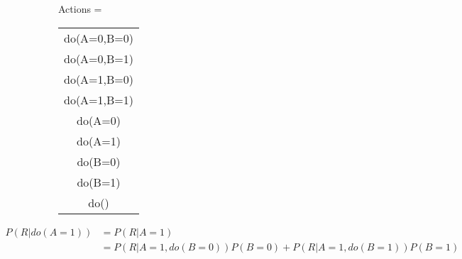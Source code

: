 \documentclass{article}
\begin{document}
\def\ci{\perp\!\!\!\perp} %


\begin{figure}
\caption{A simple causal graphical model and corresponding action space}
\label{fig:unify_frameworks}
\centering
\begin{subfigure}[c]{0.25\textwidth}
\end{subfigure}
\begin{subfigure}[t]{0.4\textwidth}
Actions = \begin{tabular}{|c|}
	\hline
  do(A=0,B=0) \\
  do(A=0,B=1) \\
  do(A=1,B=0) \\
  do(A=1,B=1) \\
  \hline
  do(A=0) \\
  do(A=1) \\
  do(B=0) \\
  do(B=1) \\
  do() \\
  \hline
\end{tabular}
\end{subfigure}
\end{figure}





\begin{equation}
\begin{aligned}
P(R|do(A=1)) & = P(R|A=1) \\
			 & = P(R|A=1,do(B=0))P(B=0)+ P(R|A=1,do(B=1))P(B=1)
\end{aligned}
\end{equation}
\end{document}
